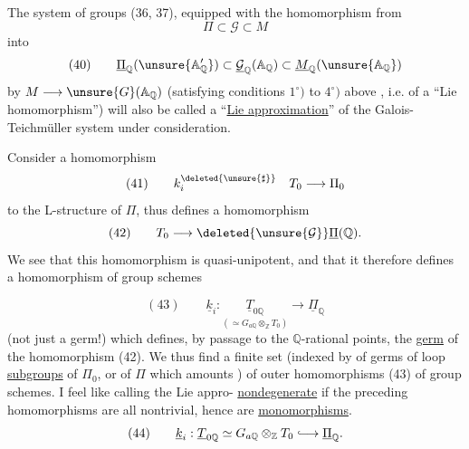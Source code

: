 The system of groups  (36, 37), equipped
with the homomorphism from
\[
\Pi \subset \mathcal{G} \subset M
\]
into 
\[
(40)\qquad
\underline{\Pi}_{\mathbb{Q}}(\unsure{\mathbb{A}'_{\mathbb{Q}}})
\subset \underline{\mathcal{G}}_{\mathbb{Q}}(\mathbb{A}_{\mathbb{Q}})
\subset \underline{M}_{\mathbb{Q}}(\unsure{\mathbb{A}_{\mathbb{Q}}})
\]
  by
$M\longrightarrow \unsure{G}(\mathbb{A}_{\mathbb{Q}})$ (satisfying
conditions $1^\circ)$ to $4^\circ)$ above \deleted{\unsure{)}}, i.e.
of a ``Lie homomorphism'') will also be called
a ``\uline{Lie approximation}'' of the
Galois-Teichmüller system under consideration.

Consider a homomorphism
\[
(41)\qquad k_i^{\deleted{\unsure{\sharp}}}\quad T_0\longrightarrow\Pi_0
\]
 to the L-structure of $\Pi$,
thus defines 
a homomorphism
\[
(42)\qquad T_0\longrightarrow
\deleted{\unsure{\mathcal{G}}}\underline{\Pi}(\mathbb{Q}).
\]
We see  that this  homomorphism
is quasi-unipotent, and that it therefore defines
a homomorphism of  group schemes

\[
(43)\qquad \underline{k}_i:
\underset{(\simeq G_{a\mathbb{Q}}\otimes_{\mathbb{Z}}T_0)}{\underline{T}_{0\mathbb{Q}}}
\longrightarrow \underline{\Pi}_{\mathbb{Q}}
\]
(not just a germ!)
which defines, by  passage to
the $\mathbb{Q}$-rational points, the \uline{germ} of the homomorphism
(42). We thus find a finite set
(indexed by  of germs of loop \uline{subgroups}
of $\Pi_0$, or of $\Pi$ which amounts 
) of outer homomorphisms (43) of group
schemes. I feel like calling the Lie appro- \uline{nondegenerate} if
the preceding homomorphisms are all nontrivial,
hence are \uline{monomorphisms}.
\[
(44)\qquad \underline{k}_i:
\underline{T}_{0\mathbb{Q}}\simeq G_{a\mathbb{Q}}\otimes_{\mathbb{Z}}T_0
\lhook\joinrel\longrightarrow \underline{\Pi}_{\mathbb{Q}}.
\]

